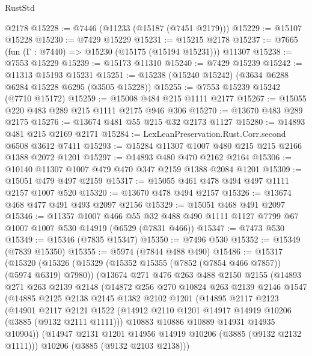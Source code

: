 \begin{lexlean}{RustStd}
\begin{coremodule}
    @2178
@15228 := @7446 (@11233 (@15187 (@7451 @2179)))
@15229 := @15107 @15228
@15230 := @7429 @15229
@15231 := @15215 @2178
@15237 := @7665 (fun (Γ : @7440) => @15230 (@15175 (@15194 @15231))) @11307
@15238 := @7553 @15229
@15239 := @15173 @11310
@15240 := @7429 @15239
@15242 := @11313 @15193 @15231
@15251 := @15238 (@15240 @15242) (@3634 @6288 @6284 @15228 @6295 (@3505 @15228))
@15255 := @7553 @15239 @15242 (@7710 @15172)
@15259 := @15008 @484 @215 @1111 @2177
@15267 := @15055 @220 @483 @289 @215 @1111 @2175 @946 @306
@15270 := @13670 @483 @289 @2175
@15276 := @13674 @481 @55 @215 @32 @2173 @1127
@15280 := @14893 @481 @215 @2169 @2171
@15284 := LexLeanPreservation.Rust.Corr.second @6508 @3612 @7411
@15293 := @15284 @11307 @1007 @480 @215 @215 @2166 @1388 @2072 @1201
@15297 := @14893 @480 @470 @2162 @2164
@15306 := @10140 @11307 @1007 @479 @470 @347 @2159 @1388 @2084 @1201
@15309 := @15051 @479 @497 @2159
@15317 := @15055 @461 @478 @494 @497 @1111 @2157 @1007 @520
@15320 := @13670 @478 @494 @2157
@15326 := @13674 @468 @477 @491 @493 @2097 @2156
@15329 := @15051 @468 @491 @2097
@15346 := @11357
    @1007
    @466
    @55
    @32
    @488
    @490
    @1111
    @1127
    @7799
    @67
    @1007
    @1007
    @530
    @14919
    (@6529 (@7831 @466))
@15347 := @7473 @530
@15349 := @15346 (@7835 @15347)
@15350 := @7496 @530
@15352 := @15349 (@7839 @15350)
@15355 := @5974 (@7844 @488 @490)
@15486 := @15317
    (@15320
      (@15326
        (@15329 (@15352 @15355 (@7852 (@7854 @466 @7857)) (@5974 @6319) @7980))
        (@13674
          @271
          @476
          @263
          @488
          @2150
          @2155
          (@14893
            @271
            @263
            @2139
            @2148
            (@14872
              @256
              @270
              @10824
              @263
              @2139
              @2146
              @1547
              (@14885
                @2125
                @2138
                @2145
                @1382
                @2102
                @1201
                (@14895
                  @2117
                  @2123
                  (@14901
                    @2117
                    @2121
                    @1522
                    (@14912 @2110 @1201 @14917 @14919 @10206 (@3885 (@9132 @2111 @1111)))
                    @10883
                    @10886
                    @10889
                    @14931
                    @14935
                    @10904))
                (@14947 @2131 @1201 @14956 @14919 @10206 (@3885 (@9132 @2132 @1111)))
                @10206
                (@3885 (@9132 @2103 @2138)))

\end{coremodule}
\end{lexlean}
